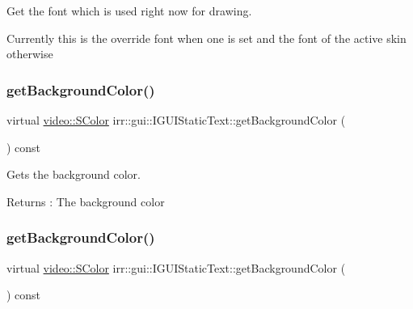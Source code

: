 Get the font which is used right now for drawing. 

Currently this is the override font when one is set and the font of the active skin otherwise \mbox{\label{classirr_1_1gui_1_1IGUIStaticText_a7149fff0b2c4159503f114807e0b0a83}} 
\subsubsection{\texorpdfstring{get\+Background\+Color()}{getBackgroundColor()}\hspace{0.1cm}{\footnotesize\ttfamily [1/2]}}
{\footnotesize\ttfamily virtual \hyperlink{classirr_1_1video_1_1SColor}{video\+::\+S\+Color} irr\+::gui\+::\+I\+G\+U\+I\+Static\+Text\+::get\+Background\+Color (\begin{DoxyParamCaption}{ }\end{DoxyParamCaption}) const\hspace{0.3cm}{\ttfamily [pure virtual]}}



Gets the background color. 

\begin{DoxyReturn}{Returns}
\+: The background color 
\end{DoxyReturn}
\mbox{\label{classirr_1_1gui_1_1IGUIStaticText_a7149fff0b2c4159503f114807e0b0a83}} 
\subsubsection{\texorpdfstring{get\+Background\+Color()}{getBackgroundColor()}\hspace{0.1cm}{\footnotesize\ttfamily [2/2]}}
{\footnotesize\ttfamily virtual \hyperlink{classirr_1_1video_1_1SColor}{video\+::\+S\+Color} irr\+::gui\+::\+I\+G\+U\+I\+Static\+Text\+::get\+Background\+Color (\begin{DoxyParamCaption}{ }\end{DoxyParamCaption}) const\hspace{0.3cm}{\ttfamily [pure virtual]}}



